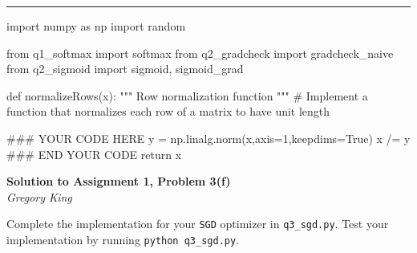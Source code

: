 \documentclass[letter,12pt]{article}
\newcommand{\myhwtitle}[3]
{\begin{center}
{\large {\bf Solution to Assignment {#1}, Problem {#2}}}\\
\medskip 
{\it {#3}} %
\end{center}}
\begin{document}
\noindent\rule{\textwidth}{0.4pt}\vspace{5mm}
\begin{python}
import numpy as np
import random

from q1_softmax import softmax
from q2_gradcheck import gradcheck_naive
from q2_sigmoid import sigmoid, sigmoid_grad

def normalizeRows(x):
    """ Row normalization function """
    # Implement a function that normalizes each row of a matrix to have unit length
    
    ### YOUR CODE HERE
    y = np.linalg.norm(x,axis=1,keepdims=True)
    x /= y
    ### END YOUR CODE
    return x
\end{python}
\clearpage
\myhwtitle{1}{3(f)}{Gregory King}
\bigskip
\noindent Complete the implementation for your \texttt{SGD} optimizer in \texttt{q3\_sgd.py}. Test your implementation by running \texttt{python q3\_sgd.py}.
\end{document}
